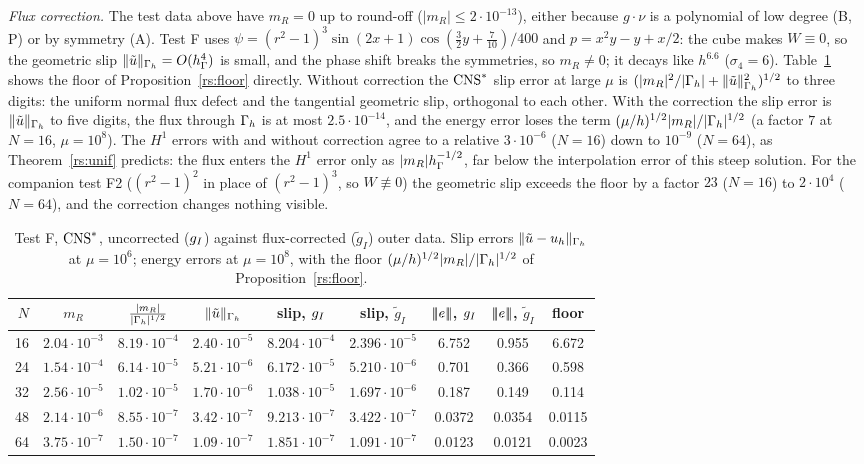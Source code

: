 \emph{Flux correction.} The test data above have $m_R=0$ up to round-off ($|m_R|\le2\cdot10^{-13}$), either because $g\cdot\nu$ is a polynomial of low degree (B, P) or by symmetry (A). Test F uses $\psi=(r^2-1)^3\sin(2x+1)\cos(\frac32y+\frac7{10})/400$ and $p=x^2y-y+x/2$: the cube makes $W\equiv0$, so the geometric slip $\lVert \tilde u\rVert_{\Gamma_h}=O(h_\Gamma^4)$ is small, and the phase shift breaks the symmetries, so $m_R\neq0$; it decays like $h^{6.6}$ ($\sigma_4=6$). Table~\ref{rs:tab:flux} shows the floor of Proposition~\ref{rs:floor} directly. Without correction the $\mathrm{CNS}^\ast$ slip error at large $\mu$ is $(|m_R|^2/|\Gamma_h|+\lVert \tilde u\rVert^2_{\Gamma_h})^{1/2}$ to three digits: the uniform normal flux defect and the tangential geometric slip, orthogonal to each other. With the correction the slip error is $\lVert \tilde u\rVert_{\Gamma_h}$ to five digits, the flux through $\Gamma_h$ is at most $2.5\cdot10^{-14}$, and the energy error loses the term $(\mu/h)^{1/2}|m_R|/|\Gamma_h|^{1/2}$ (a factor $7$ at $N=16$, $\mu=10^8$). The $H^1$ errors with and without correction agree to a relative $3\cdot10^{-6}$ ($N=16$) down to $10^{-9}$ ($N=64$), as Theorem~\ref{rs:unif} predicts: the flux enters the $H^1$ error only as $|m_R|h_\Gamma^{-1/2}$, far below the interpolation error of this steep solution. For the companion test F2 ($(r^2-1)^2$ in place of $(r^2-1)^3$, so $W\not\equiv0$) the geometric slip exceeds the floor by a factor $23$ ($N=16$) to $2\cdot10^4$ ($N=64$), and the correction changes nothing visible.

\begin{table}[t]
\centering\small
\caption{Test F, $\mathrm{CNS}^\ast$, uncorrected ($g_I$) against flux-corrected ($\tilde g_I$) outer data. Slip errors $\lVert \tilde u-u_h\rVert_{\Gamma_h}$ at $\mu=10^6$; energy errors at $\mu=10^8$, with the floor $(\mu/h)^{1/2}|m_R|/|\Gamma_h|^{1/2}$ of Proposition~\ref{rs:floor}.}\label{rs:tab:flux}
\setlength{\tabcolsep}{4pt}
\begin{tabular}{rcccccccc}
\toprule
$N$ & $m_R$ & $\frac{|m_R|}{|\Gamma_h|^{1/2}}$ & $\lVert \tilde u\rVert_{\Gamma_h}$ & slip, $g_I$ & slip, $\tilde g_I$ & $|\!|\!|e|\!|\!|$, $g_I$ & $|\!|\!|e|\!|\!|$, $\tilde g_I$ & floor\\
\midrule
16 & $2.04\cdot10^{-3}$ & $8.19\cdot10^{-4}$ & $2.40\cdot10^{-5}$ & $8.204\cdot10^{-4}$ & $2.396\cdot10^{-5}$ & 6.752 & 0.955 & 6.672\\
24 & $1.54\cdot10^{-4}$ & $6.14\cdot10^{-5}$ & $5.21\cdot10^{-6}$ & $6.172\cdot10^{-5}$ & $5.210\cdot10^{-6}$ & 0.701 & 0.366 & 0.598\\
32 & $2.56\cdot10^{-5}$ & $1.02\cdot10^{-5}$ & $1.70\cdot10^{-6}$ & $1.038\cdot10^{-5}$ & $1.697\cdot10^{-6}$ & 0.187 & 0.149 & 0.114\\
48 & $2.14\cdot10^{-6}$ & $8.55\cdot10^{-7}$ & $3.42\cdot10^{-7}$ & $9.213\cdot10^{-7}$ & $3.422\cdot10^{-7}$ & 0.0372 & 0.0354 & 0.0115\\
64 & $3.75\cdot10^{-7}$ & $1.50\cdot10^{-7}$ & $1.09\cdot10^{-7}$ & $1.851\cdot10^{-7}$ & $1.091\cdot10^{-7}$ & 0.0123 & 0.0121 & 0.0023\\
\bottomrule
\end{tabular}
\end{table}

